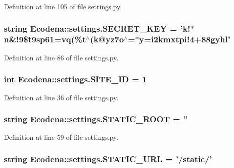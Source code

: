 Definition at line 105 of file settings.py.

\hypertarget{namespace_ecodena_1_1settings_a4debebea5e8b517ae267150eca535ff7}{
\subsubsection[{SECRET\_\-KEY}]{\setlength{\rightskip}{0pt plus 5cm}string {\bf Ecodena::settings.SECRET\_\-KEY} = 'k!$\ast$n\&!9\$t9sp61=vq(\%t$^\wedge$(k@yz7o$^\wedge$=$\ast$y=i2kmxtpi!4+88gyhl'}}
\label{d1/d62/namespace_ecodena_1_1settings_a4debebea5e8b517ae267150eca535ff7}


Definition at line 86 of file settings.py.

\hypertarget{namespace_ecodena_1_1settings_ad319badaf6f23d544fa1edc45f305951}{
\subsubsection[{SITE\_\-ID}]{\setlength{\rightskip}{0pt plus 5cm}int {\bf Ecodena::settings.SITE\_\-ID} = 1}}
\label{d1/d62/namespace_ecodena_1_1settings_ad319badaf6f23d544fa1edc45f305951}


Definition at line 36 of file settings.py.

\hypertarget{namespace_ecodena_1_1settings_abaf0b58735edb3e4b1637388fc556c1c}{
\subsubsection[{STATIC\_\-ROOT}]{\setlength{\rightskip}{0pt plus 5cm}string {\bf Ecodena::settings.STATIC\_\-ROOT} = ''}}
\label{d1/d62/namespace_ecodena_1_1settings_abaf0b58735edb3e4b1637388fc556c1c}


Definition at line 59 of file settings.py.

\hypertarget{namespace_ecodena_1_1settings_a9e3bf1c868b8e0610a556328ebbea29b}{
\subsubsection[{STATIC\_\-URL}]{\setlength{\rightskip}{0pt plus 5cm}string {\bf Ecodena::settings.STATIC\_\-URL} = '/static/'}}
\label{d1/d62/namespace_ecodena_1_1settings_a9e3bf1c868b8e0610a556328ebbea29b}


